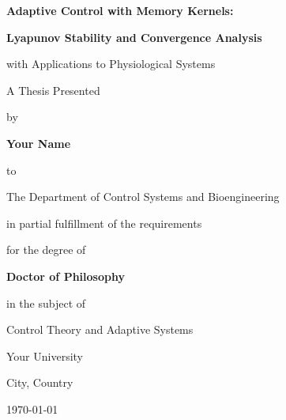 \begin{titlepage}
    \centering
    \vspace*{2cm}

    {\LARGE\bfseries Adaptive Control with Memory Kernels:\par}
    \vspace{0.5cm}
    {\Huge\bfseries Lyapunov Stability and Convergence Analysis\par}
    \vspace{0.5cm}
    {\Large with Applications to Physiological Systems\par}

    \vspace{2cm}

    {\Large A Thesis Presented\par}
    \vspace{0.3cm}
    {\Large by\par}
    \vspace{0.5cm}
    {\LARGE\bfseries Your Name\par}

    \vspace{2cm}

    {\large to\par}
    \vspace{0.3cm}
    {\large The Department of Control Systems and Bioengineering\par}

    \vspace{1cm}

    {\large in partial fulfillment of the requirements\par}
    {\large for the degree of\par}
    \vspace{0.3cm}
    {\Large\bfseries Doctor of Philosophy\par}

    \vspace{1cm}

    {\large in the subject of\par}
    \vspace{0.3cm}
    {\Large Control Theory and Adaptive Systems\par}

    \vfill

    {\large Your University\par}
    {\large City, Country\par}
    \vspace{0.3cm}
    {\large \today\par}

\end{titlepage}
